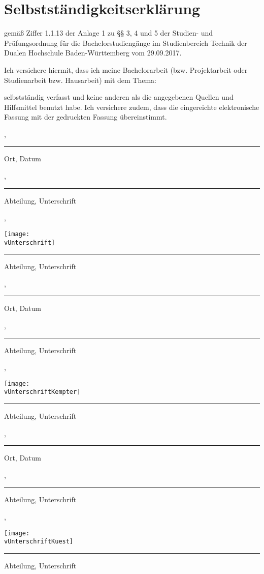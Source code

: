 \thispagestyle{empty}
\section*{\Huge{Selbstständigkeitserklärung}}

gemäß Ziffer 1.1.13 der Anlage 1 zu §§ 3, 4 und 5  der Studien- und Prüfungsordnung für die Bachelorstudiengänge im Studienbereich Technik der Dualen Hochschule Baden-Würt­tem­berg vom 29.09.2017.

\noindent Ich versichere hiermit, dass ich meine Bachelorarbeit (bzw. Projektarbeit oder Studienarbeit bzw. Hausarbeit) mit dem Thema: 
\begin{center}
	\Large\textbf{\vTitel}
\end{center}
selbstständig verfasst und keine anderen als die angegebenen Quellen und Hilfsmittel benutzt habe. Ich versichere zudem, dass die eingereichte elektronische Fassung mit der gedruckten Fassung übereinstimmt.

\vfill
\leavevmode

\parbox{6cm}{\strut\centering \vBearbeitungsort, \vAbgabedatum\hrule\strut\centering\footnotesize Ort, Datum} 
\hfill
\ifx\vUnterschrift\empty
\parbox{6cm}{\strut\hspace{1pt} \vAbteilung, \hrule\strut\centering\footnotesize Abteilung, Unterschrift}
\else
\parbox{6cm}{\strut\hspace{1pt} \vAbteilung, \parbox[b]{3cm}{\vspace{-10cm}\texttt{[image: \\vUnterschrift]}}\hrule\strut\centering\footnotesize Abteilung, Unterschrift}
\fi
\vspace{1cm}

\parbox{6cm}{\strut\centering \vBearbeitungsort, \vAbgabedatum\hrule\strut\centering\footnotesize Ort, Datum}
\hfill
\ifx\vUnterschriftKempter\empty
\parbox{6cm}{\strut\hspace{1pt} \vAbteilung, \hrule\strut\centering\footnotesize Abteilung, Unterschrift}
\else
\parbox{6cm}{\strut\hspace{1pt} \vAbteilung, \parbox[b]{3cm}{\vspace{-10cm}\texttt{[image: \\vUnterschriftKempter]}}\hrule\strut\centering\footnotesize Abteilung, Unterschrift}
\fi
\vspace{1cm}

\parbox{6cm}{\strut\centering \vBearbeitungsort, \vAbgabedatum\hrule\strut\centering\footnotesize Ort, Datum}
\hfill
\ifx\vUnterschriftKuest\empty
\parbox{6cm}{\strut\hspace{1pt} \vAbteilung, \hrule\strut\centering\footnotesize Abteilung, Unterschrift}
\else
\parbox{6cm}{\strut\hspace{1pt} \vAbteilung, \parbox[b]{3cm}{\vspace{-10cm}\texttt{[image: \\vUnterschriftKuest]}}\hrule\strut\centering\footnotesize Abteilung, Unterschrift}
\fi
\vspace{1cm}

\newpage